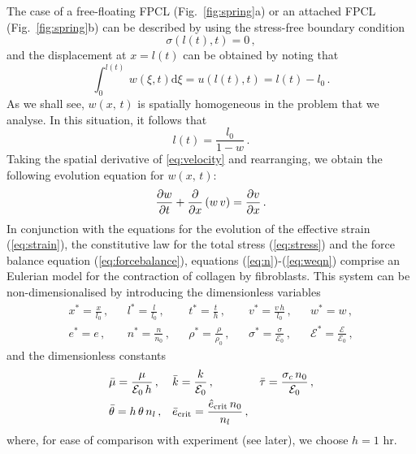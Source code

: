 The case of a free-floating FPCL (Fig.~\ref{fig:spring}a) or an attached FPCL (Fig.~\ref{fig:spring}b) can be described by using the stress-free boundary condition
\begin{equation}
\sigma(l(t),t)=0\,,
\label{eq:stressboundary}
\end{equation}
and the displacement at $x = l(t)$ can be obtained by noting that
\[\int^{l(t)}_{0}\,w(\xi,t) \mathrm{d}\xi = u(l(t),t) = l(t)-l_{0}\,.\]
As we shall see, $w(x,\,t)$ is spatially homogeneous in the problem that we analyse. In this situation, it follows that
\begin{equation}
l(t)=\frac{l_{0}}{1-w}\,.
\label{eq:Lt}
\end{equation}
Taking the spatial derivative of \eqref{eq:velocity} and rearranging, we obtain the following evolution equation for $w(x,\,t)$:
\begin{equation}
\frac{\partial w}{\partial t}+\frac{\partial }{\partial x}\left(w\,v\right)=\frac{\partial v}{\partial x}\,.
\label{eq:weqn}
\end{equation}
In conjunction with the equations for the evolution of the effective strain (\ref{eq:strain}), the constitutive law for the total stress (\ref{eq:stress}) and the force balance equation (\ref{eq:forcebalance}), equations (\ref{eq:n})-(\ref{eq:weqn}) comprise an Eulerian model for the contraction of collagen by fibroblasts. This system can be non-dimensionalised by introducing the dimensionless variables
\begin{align*}
&x^{*}=\frac{x}{l_{0}}\,,&
&l^{*}=\frac{l}{l_{0}}\,,&
&t^{*}=\frac{t}{h}\,,&
&v^{*}=\frac{v\,h}{l_{0}}\,,&
&w^{*}=w\,,\\
&e^{*}=e\,,&
&n^{*}=\frac{n}{n_{0}}\,,&
&\rho^{*}=\frac{\rho}{\rho_{0}}\,,&
&\sigma^{*}=\frac{\sigma}{\mathcal{E}_{0}}\,,&
&\mathcal{E}^{*}=\frac{\mathcal{E}}{\mathcal{E}_{0}}\,,&
\end{align*}
and the dimensionless constants
\begin{equation}
\begin{aligned}
&\bar{\mu} = \frac{\mu}{\mathcal{E}_{0}\,h}\,,&
&\bar{k} = \frac{k}{\mathcal{E}_{0}}\,,&
&\bar{\tau} = \frac{\sigma_{c} \, n_0}{\mathcal{E}_{0}}\,,\\
&\bar{\theta} = h\,\theta\,n_{l}\,,&
&\bar{e}_{\rm crit} = \frac{\hat{e}_{\rm crit}\,n_{0}}{n_{l}}\,,&
\end{aligned}
\label{eq:parameters}
\end{equation}
where, for ease of comparison with experiment (see later), we choose $h=1$ hr.

